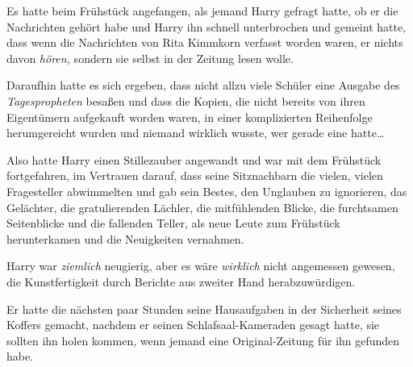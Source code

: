 Es hatte beim Frühstück angefangen, als jemand Harry gefragt hatte, ob er die Nachrichten gehört habe und Harry ihn schnell unterbrochen und gemeint hatte, dass wenn die Nachrichten von Rita Kimmkorn verfasst worden waren, er nichts davon \emph{hören,} sondern sie selbst in der Zeitung lesen wolle.

Daraufhin hatte es sich ergeben, dass nicht allzu viele Schüler eine Ausgabe des \emph{Tagespropheten} besaßen und dass die Kopien, die nicht bereits von ihren Eigentümern aufgekauft worden waren, in einer komplizierten Reihenfolge herumgereicht wurden und niemand wirklich wusste, wer gerade eine hatte…

Also hatte Harry einen Stillezauber angewandt und war mit dem Frühstück fortgefahren, im Vertrauen darauf, dass seine Sitznachbarn die vielen, vielen Fragesteller abwimmelten und gab sein Bestes, den Unglauben zu ignorieren, das Gelächter, die gratulierenden Lächler, die mitfühlenden Blicke, die furchtsamen Seitenblicke und die fallenden Teller, als neue Leute zum Frühstück herunterkamen und die Neuigkeiten vernahmen.

Harry war \emph{ziemlich} neugierig, aber es wäre \emph{wirklich} nicht angemessen gewesen, die Kunstfertigkeit durch Berichte aus zweiter Hand herabzuwürdigen.

Er hatte die nächsten paar Stunden seine Hausaufgaben in der Sicherheit seines Koffers gemacht, nachdem er seinen Schlafsaal-Kameraden gesagt hatte, sie sollten ihn holen kommen, wenn jemand eine Original-Zeitung für ihn gefunden habe.

